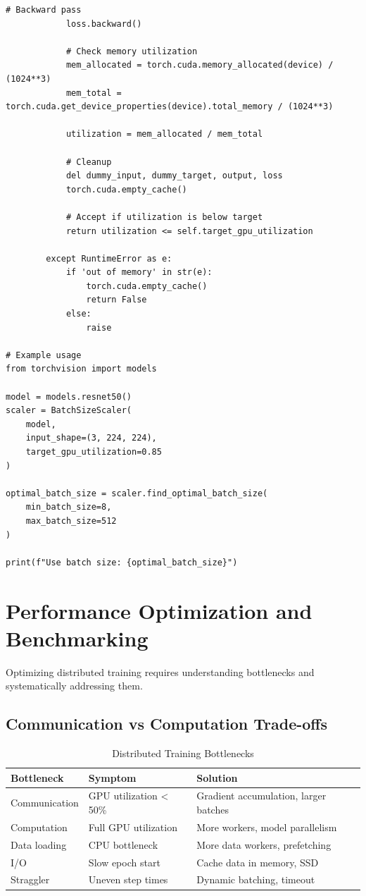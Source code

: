 \begin{lstlisting}[style=python, caption=Automatic Batch Size Scaling]
            # Backward pass
            loss.backward()

            # Check memory utilization
            mem_allocated = torch.cuda.memory_allocated(device) / (1024**3)
            mem_total = torch.cuda.get_device_properties(device).total_memory / (1024**3)

            utilization = mem_allocated / mem_total

            # Cleanup
            del dummy_input, dummy_target, output, loss
            torch.cuda.empty_cache()

            # Accept if utilization is below target
            return utilization <= self.target_gpu_utilization

        except RuntimeError as e:
            if 'out of memory' in str(e):
                torch.cuda.empty_cache()
                return False
            else:
                raise

# Example usage
from torchvision import models

model = models.resnet50()
scaler = BatchSizeScaler(
    model,
    input_shape=(3, 224, 224),
    target_gpu_utilization=0.85
)

optimal_batch_size = scaler.find_optimal_batch_size(
    min_batch_size=8,
    max_batch_size=512
)

print(f"Use batch size: {optimal_batch_size}")
\end{lstlisting}

\section{Performance Optimization and Benchmarking}

Optimizing distributed training requires understanding bottlenecks and systematically addressing them.

\subsection{Communication vs Computation Trade-offs}

\begin{table}[h]
\centering
\caption{Distributed Training Bottlenecks}
\label{tab:bottlenecks}
\small
\begin{tabular}{@{}lp{4cm}p{4.5cm}@{}}
\toprule
\textbf{Bottleneck} & \textbf{Symptom} & \textbf{Solution} \\
\midrule
Communication & GPU utilization < 50\% & Gradient accumulation, larger batches \\
Computation & Full GPU utilization & More workers, model parallelism \\
Data loading & CPU bottleneck & More data workers, prefetching \\
I/O & Slow epoch start & Cache data in memory, SSD \\
Straggler & Uneven step times & Dynamic batching, timeout \\
\bottomrule
\end{tabular}
\end{table}

